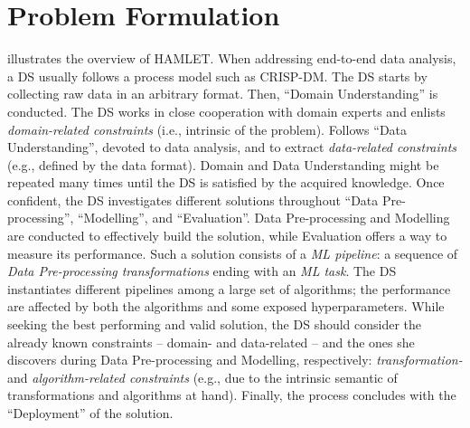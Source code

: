 \documentclass[5p,times]{elsarticle}
\begin{document}
\section{Problem Formulation}\label{sec:problem}
 illustrates the overview of HAMLET.
When addressing end-to-end data analysis, a DS usually follows a process model such as CRISP-DM.
The DS starts by collecting raw data in an arbitrary format.
Then, ``Domain Understanding'' is conducted.
The DS works in close cooperation with domain experts and enlists \emph{domain-related constraints} (i.e., intrinsic of the problem).
Follows ``Data Understanding'', devoted to data analysis, and to extract \emph{data-related constraints} (e.g., defined by the data format).
Domain and Data Understanding might be repeated many times until the DS is satisfied by the acquired knowledge.
Once confident, the DS investigates different solutions throughout ``Data Pre-processing'', ``Modelling'', and ``Evaluation''.
Data Pre-processing and Modelling are conducted to effectively build the solution, while Evaluation offers a way to measure its performance.
Such a solution consists of a \emph{ML pipeline}: a sequence of \emph{Data Pre-processing transformations} ending with an \emph{ML task}.
The DS instantiates different pipelines among a large set of algorithms; the performance are affected by both the algorithms and some exposed hyperparameters.
While seeking the best performing and valid solution, the DS should consider the already known constraints -- domain- and data-related -- and the ones she discovers during Data Pre-processing and Modelling, respectively: \emph{transformation-} and \emph{algorithm-related constraints} (e.g., due to the intrinsic semantic of transformations and algorithms at hand).
Finally, the process concludes with the ``Deployment'' of the solution.
\end{document}
